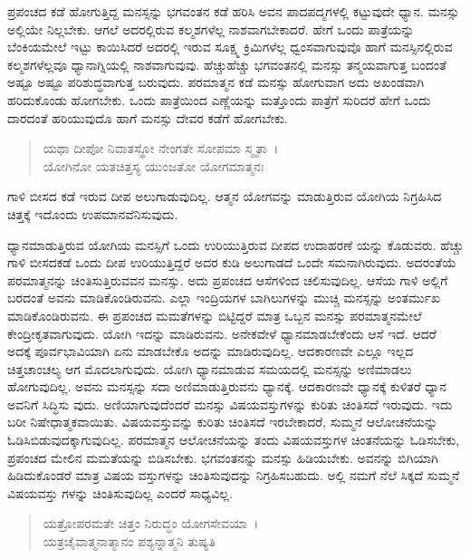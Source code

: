ಪ್ರಪಂಚದ ಕಡೆ ಹೋಗುತ್ತಿದ್ದ ಮನಸ್ಸನ್ನು ಭಗವಂತನ ಕಡೆ ಹರಿಸಿ ಅವನ ಪಾದಪದ್ಮಗಳಲ್ಲಿ ಕಟ್ಟುವುದೇ ಧ್ಯಾನ. ಮನಸ್ಸು ಅಲ್ಲಿಯೇ ನಿಲ್ಲಬೇಕು. ಆಗಲೆ ಅದರಲ್ಲಿರುವ ಕಲ್ಮಶಗಳೆಲ್ಲ ನಾಶವಾಗಬೇಕಾದರೆ. ಹೇಗೆ ಒಂದು ಪಾತ್ರೆಯನ್ನು ಬೆಂಕಿಯಮೇಲೆ ಇಟ್ಟು ಕಾಯಿಸಿದರೆ ಅದರಲ್ಲಿ ಇರುವ ಸೂಕ್ಷ್ಮ ಕ್ರಿಮಿಗಳೆಲ್ಲ ಧ್ವಂಸವಾಗುವುವೊ ಹಾಗೆ ಮನಸ್ಸಿನಲ್ಲಿರುವ ಕಲ್ಮಶಗಳೆಲ್ಲವೂ ಧ್ಯಾನಾಗ್ನಿಯಲ್ಲಿ ನಾಶವಾಗುವುವು. ಹೆಚ್ಚುಹೆಚ್ಚು ಭಗವಂತನಲ್ಲಿ ಮನಸ್ಸು ತನ್ಮಯವಾಗುತ್ತ ಬಂದಂತೆ ಅಷ್ಟೂ ಅಷ್ಟೂ ಪರಿಶುದ್ಧವಾಗುತ್ತ ಬರುವುದು. ಪರಮಾತ್ಮನ ಕಡೆ ಮನಸ್ಸು ಹೋಗುವಾಗ ಅದು ಅಖಂಡವಾಗಿ ಹರಿದುಕೊಂಡು ಹೋಗಬೇಕು. ಒಂದು ಪಾತ್ರೆಯಿಂದ ಎಣ್ಣೆಯನ್ನು ಮತ್ತೊಂದು ಪಾತ್ರೆಗೆ ಸುರಿದರೆ ಹೇಗೆ ಒಂದು ದಾರದಂತೆ ಹರಿಯುವುದೊ ಹಾಗೆ ಮನಸ್ಸು ದೇವರ ಕಡೆಗೆ ಹೋಗಬೇಕು.

\begin{verse}
ಯಥಾ ದೀಪೋ ನಿವಾತಸ್ಥೋ ನೇಂಗತೇ ಸೋಪಮಾ ಸ್ಮೃತಾ~।\\ಯೋಗಿನೋ ಯತಚಿತ್ತಸ್ಯ ಯುಂಜತೋ ಯೋಗಮಾತ್ಮನಃ 
\end{verse}

{\small ಗಾಳಿ ಬೀಸದ ಕಡೆ ಇರುವ ದೀಪ ಅಲುಗಾಡುವುದಿಲ್ಲ. ಆತ್ಮನ ಯೋಗವನ್ನು ಮಾಡುತ್ತಿರುವ ಯೋಗಿಯ ನಿಗ್ರಹಿಸಿದ ಚಿತ್ತಕ್ಕೆ ಇದೊಂದು ಉಪಮಾನವೆನಿಸುವುದು.}

ಧ್ಯಾನಮಾಡುತ್ತಿರುವ ಯೋಗಿಯ ಮನಸ್ಸಿಗೆ ಒಂದು ಉರಿಯುತ್ತಿರುವ ದೀಪದ ಉದಾಹರಣೆ ಯನ್ನು ಕೊಡುವರು. ಹೆಚ್ಚು ಗಾಳಿ ಬೀಸದಕಡೆ ಒಂದು ದೀಪ ಉರಿಯುತ್ತಿದ್ದರೆ ಅದರ ಕುಡಿ ಅಲುಗಾಡದೆ ಒಂದೇ ಸಮನಾಗಿರುವುದು. ಅದರಂತೆಯೆ ಪರಮಾತ್ಮನನ್ನು ಚಿಂತಿಸುತ್ತಿರುವವನ ಮನಸ್ಸು. ಅದು ಪ್ರಪಂಚದ ಆಸೆಗಳಿಂದ ಚಲಿಸುವುದಿಲ್ಲ. ಆಸೆಯ ಗಾಳಿ ಅಲ್ಲಿಗೆ ಬರದಂತೆ ಅವನು ಮಾಡಿಕೊಂಡಿರುವನು. ಎಲ್ಲಾ ಇಂದ್ರಿಯಗಳ ಬಾಗಿಲುಗಳನ್ನು ಮುಚ್ಚಿ ಮನಸ್ಸನ್ನು ಅಂತರ್ಮುಖ ಮಾಡಿಕೊಂಡಿರುವನು. ಈ ಪ್ರಪಂಚದ ಮಮತೆಗಳನ್ನು ಬಿಟ್ಟಿದ್ದರೆ ಮಾತ್ರ ಒಬ್ಬನ ಮನಸ್ಸು ಪರಮಾತ್ಮನಮೇಲೆ ಕೇಂದ್ರೀಕೃತವಾಗುವುದು. ಯೋಗಿ ಇದನ್ನು ಮಾಡಿರುವನು. ಅನೇಕವೇಳೆ ಧ್ಯಾನಮಾಡಬೇಕೆಂದು ಆಸೆ ಇದೆ. ಆದರೆ ಅದಕ್ಕೆ ಪೂರ್ವಭಾವಿಯಾಗಿ ಏನು ಮಾಡಬೇಕೊ ಅದನ್ನು ಮಾಡಿರುವುದಿಲ್ಲ. ಆದಕಾರಣವೇ ಎಲ್ಲೂ ಇಲ್ಲದ ಚಿತ್ತಚಾಂಚಲ್ಯ ಆಗ ಮೊದಲಾಗುವುದು. ಯೋಗಿ ಧ್ಯಾನಮಾಡುವ ಸಮಯದಲ್ಲಿ ಮನಸ್ಸನ್ನು ಅಣಿಮಾಡಲು ಹೋಗುವುದಿಲ್ಲ. ಅವನು ಮನಸ್ಸನ್ನು ಸದಾ ಅಣಿಮಾಡುತ್ತಿರುವನು ಧ್ಯಾನಕ್ಕೆ. ಆದಕಾರಣವೇ ಧ್ಯಾನಕ್ಕೆ ಕುಳಿತರೆ ಧ್ಯಾನ ಅವನಿಗೆ ಸಿದ್ಧಿಸು ವುದು. ಅಣಿಯಾಗುವುದೆಂದರೆ ಮನಸ್ಸು ವಿಷಯವಸ್ತುಗಳನ್ನು ಕುರಿತು ಚಿಂತಿಸದೆ ಇರುವುದು. ಇದು ಬರೀ ನಿಷೇಧಾತ್ಮಕವಾಯಿತು. ವಿಷಯವಸ್ತುವನ್ನು ಕುರಿತು ಚಿಂತಿಸದೆ ಇರಬೇಕಾದರೆ, ಸುಮ್ಮನೆ ಆಲೋಚನೆಯನ್ನು ಓಡಿಸಿಬಿಡುವುದಕ್ಕಾಗುವುದಿಲ್ಲ. ಪರಮಾತ್ಮನ ಆಲೋಚನೆಯನ್ನು ತಂದು ವಿಷಯವಸ್ತುಗಳ ಚಿಂತನೆಯನ್ನು ಓಡಿಸಬೇಕು, ಪ್ರಪಂಚದ ಮೇಲಿನ ಮಮತೆಯನ್ನು ಬಿಡಿಸಬೇಕು. ಭಗವಂತನನ್ನು ಮನಸ್ಸು ಹಿಡಿಯಬೇಕು. ಅವನನ್ನು ಬಿಗಿಯಾಗಿ ಹಿಡಿದುಕೊಂಡರೆ ಮಾತ್ರ ವಿಷಯ ವಸ್ತುಗಳನ್ನು ಚಿಂತಿಸುವುದನ್ನು ನಿಗ್ರಹಿಸಬಹುದು. ಅಲ್ಲಿ ನಮಗೆ ನೆಲೆ ಸಿಕ್ಕದೆ ಸುಮ್ಮನೆ ವಿಷಯವಸ್ತು ಗಳನ್ನು ಚಿಂತಿಸುವುದಿಲ್ಲ ಎಂದರೆ ಸಾಧ್ಯವಿಲ್ಲ.

\begin{verse}
ಯತ್ರೋಪರಮತೇ ಚಿತ್ತಂ ನಿರುದ್ಧಂ ಯೋಗಸೇವಯಾ~।\\ಯತ್ರಚೈವಾತ್ಮನಾತ್ಮಾನಂ ಪಶ್ಯನ್ನಾತ್ಮನಿ ತುಷ್ಯತಿ 
\end{verse}

